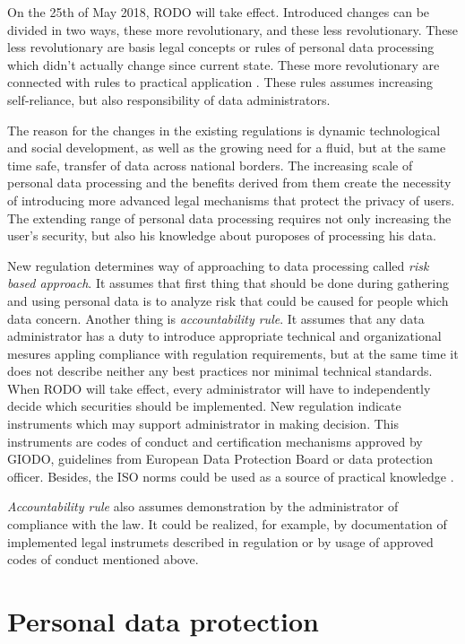 \documentclass[en, noamssymb]{mgr}
\begin{document}
On the 25th of May 2018, RODO will take effect. Introduced changes can be divided in two ways, these more revolutionary, and these less revolutionary. These less revolutionary are basis legal concepts or rules of personal data processing which didn't actually change since current state. These more revolutionary are connected with rules to practical application \cite{giodo}. These rules assumes increasing self-reliance, but also responsibility of data administrators.

\indent The reason for the changes in the existing 	regulations is dynamic technological and social development, as well as the growing need for a fluid, but at the same time safe, transfer of data across national borders. The increasing scale of personal data processing and the benefits derived from them create the necessity of introducing more advanced legal mechanisms that protect the privacy of users. The extending range of personal data processing requires not only increasing the user's security, but also his knowledge about puroposes of processing his data.

\indent New regulation determines way of approaching to data processing called \textit{risk based approach}. It assumes that first thing that should be done during gathering and using personal data is to analyze risk that could be caused for people which data concern. Another thing is \textit{accountability rule}. It assumes that any data administrator has a duty to introduce appropriate technical and organizational mesures appling compliance with regulation requirements, but at the same time it does not describe neither any best practices nor minimal technical standards. When RODO will take effect, every administrator will have to independently decide which securities should be implemented. New regulation indicate instruments which may support administrator in making decision. This instruments are codes of conduct and certification mechanisms approved by GIODO, guidelines from European Data Protection Board or data protection officer. Besides, the ISO norms could be used as a source of practical knowledge \cite{giodo}.

\indent \textit{Accountability rule} also assumes demonstration by the administrator of compliance with the law. It could be realized, for example, by documentation of implemented legal instrumets described in regulation or by usage of approved codes of conduct mentioned above.


\chapter{Personal data protection} \label{sec:sekcjaDaneOsobowe}
\end{document}
